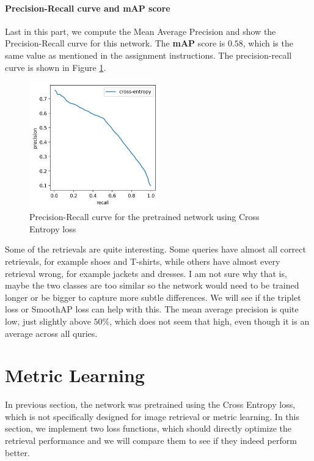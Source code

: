 \documentclass[a4paper,11pt]{article}
\begin{document}
\paragraph{Precision-Recall curve and mAP score} Last in this part, we compute the Mean Average Precision and show the Precision-Recall curve for this network.
The \textbf{mAP} score is $0.58$, which is the same value as mentioned in the assignment instructions.
The precision-recall curve is shown in Figure \ref{fig:pr_ce}.
\begin{figure}[ht]
    \centering
    \includegraphics[width=0.5\textwidth]{../outputs/pr_ce.png}
    \caption{Precision-Recall curve for the pretrained network using Cross Entropy loss}
    \label{fig:pr_ce}
\end{figure}

Some of the retrievals are quite interesting.
Some queries have almost all correct retrievals, for example shoes and T-shirts, while others have almost every retrieval wrong, for example jackets and dresses.
I am not sure why that is, maybe the two classes are too similar so the network would need to be trained longer or be bigger to capture more subtle differences.
We will see if the triplet loss or SmoothAP loss can help with this.
The mean average precision is quite low, just slightly above $50\%$, which does not seem that high, even though it is an average across all quries.

\section{Metric Learning}
In previous section, the network was pretrained using the Cross Entropy loss, which is not specifically designed for image retrieval or metric learning.
In this section, we implement two loss functions, which should directly optimize the retrieval performance and we will compare them to see if they indeed perform better.
\end{document}
